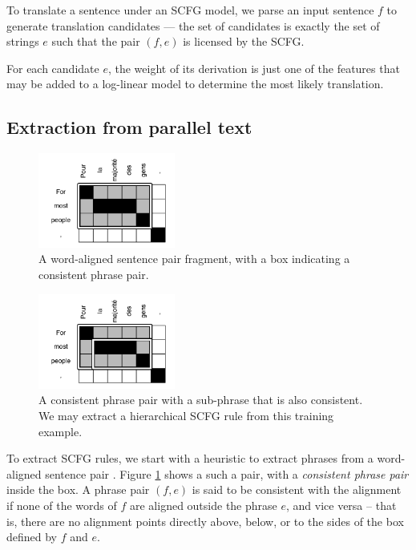 \documentclass[a4paper]{article}
\begin{document}
To translate a sentence under an SCFG model, we parse an input sentence $f$ to generate translation candidates --- the set of candidates is exactly the set of strings $e$ such that the pair $(f,e)$ is licensed by the SCFG.

For each candidate $e$, the weight of its derivation is just one of the features that may be added to a log-linear model to determine the most likely translation.

\subsection{Extraction from parallel text}

\begin{figure}[t]
\includegraphics[width=0.4\textwidth]{figures/simple-rule}
\caption{A word-aligned sentence pair fragment, with a box indicating a consistent phrase pair.\label{fig:aligned-sentence}}
\end{figure}

\begin{figure}[t]
\includegraphics[width=0.4\textwidth]{figures/hierarchical-rule}
\caption{A consistent phrase pair with a sub-phrase that is also consistent. We may extract a hierarchical SCFG rule from this training example.\label{fig:hierarchical-phrases}}
\end{figure}

To extract SCFG rules, we start with a heuristic to extract phrases from a word-aligned sentence pair \cite{tillmann-2003}. Figure \ref{fig:aligned-sentence} shows a such a pair, with a {\em consistent phrase pair} inside the box. A phrase pair $(f,e)$ is said to be consistent with the alignment if none of the words of $f$ are aligned outside the phrase $e$, and vice versa -- that is, there are no alignment points directly above, below, or to the sides of the box defined by $f$ and $e$.
\end{document}
